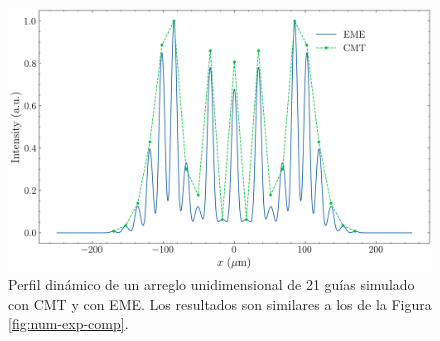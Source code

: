 \begin{figure}[h]
	\centering
	\includegraphics[width=\linewidth]{codigo/1darraycmt/1darraycmt.png}
	\caption[Dinámica con EME y CMT.]{Perfil dinámico de un arreglo unidimensional de 21 guías simulado con CMT y con EME. Los resultados son similares a los de la Figura \ref{fig:num-exp-comp}.}
	\label{fig:1darraycmt}
\end{figure}
